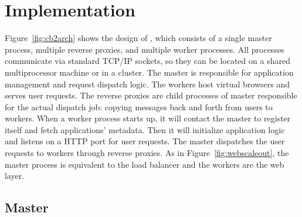 \chapter{Implementation}
\label{ch:impl}

%
\newarchitectureoverview{}

Figure~\ref{fig:cb2arch} shows the design of \cbtwo, which consists of a single
master process, multiple reverse proxies, and multiple worker processes.
All processes communicate via standard TCP/IP sockets, 
so they can be located on a shared multiprocessor machine or in a cluster.
The master is responsible for application management and request dispatch logic.
The workers host virtual browsers and serves user requests.
The reverse proxies are child processes of master responsible for the actual
dispatch job: copying messages back and forth from users to workers.
When a worker process starts up, it will contact the master to register itself
and fetch applications' metadata.
Then it will initialize application logic and listens on a HTTP port for user requests.
The master dispatches the user requests to workers through reverse proxies.
As in Figure~\ref{fig:webscaleout}, the master process is equivalent to the load balancer
and the workers are the web layer.

\section{Master}


